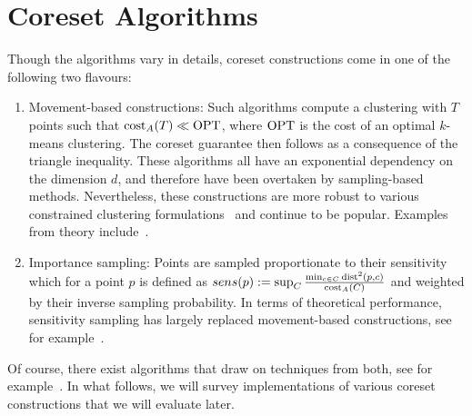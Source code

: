 \section{Coreset Algorithms}
\label{sec:algorithms}

Though the algorithms vary in details, coreset constructions come in one of the following two flavours:
\begin{enumerate}
\item Movement-based constructions: Such algorithms compute a clustering with $T$ points such that $\text{cost}_A(T)\ll \text{OPT}$, where $\text{OPT}$ is the cost of an optimal $k$-means clustering. 
The coreset guarantee then follows as a consequence of the triangle inequality. These algorithms all have an exponential dependency on the dimension $d$, and therefore have been overtaken by sampling-based methods. Nevertheless, these constructions are more robust to various constrained clustering formulations~\cite{HuangJV19,SSS19} and continue to be popular. Examples from theory include~\cite{FrahlS2005,HaM04}. 
\item Importance sampling: Points are sampled proportionate to their sensitivity which for a point $p$ is defined as $sens(p):=\sup_{C} \frac{\min_{c\in C} \text{dist}^2(p,c)}{\text{cost}_A(C)}$ and weighted by their inverse sampling probability. In terms of theoretical performance, sensitivity sampling has largely replaced movement-based constructions, see for example~\cite{FeldmanL11,LangbergS10}.  
\end{enumerate}

Of course, there exist algorithms that draw on techniques from both, see for example~\cite{Cohen-AddadSS21}. In what follows, we will survey implementations of various coreset constructions that we will evaluate later.


